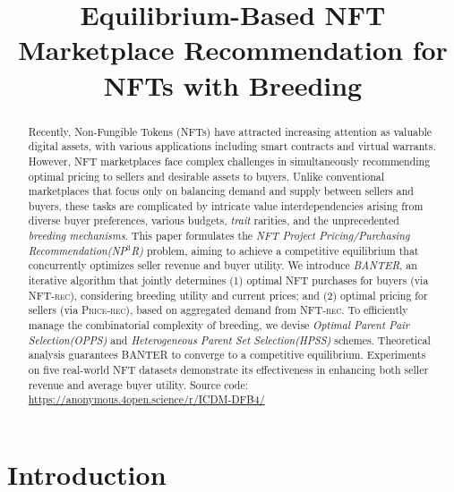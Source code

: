 \documentclass[conference]{IEEEtran}
\newcommand{\1}[1]{\mathds{1}\left[#1\right]}
\theoremstyle{plain}
\newcommand{\method}{\textsf{BANTER}\xspace}
\newcommand{\problem}{NP$^3$R\xspace}
\newcommand{\problemfull}{NFT Project Pricing/Purchasing Recommendation\xspace}
\newcommand{\homosfull}{Optimal Parent Pair Selection\xspace}
\newcommand{\homos}{OPPS\xspace}
\newcommand{\hetersfull}{Heterogeneous Parent Set Selection\xspace}
\newcommand{\heters}{HPSS\xspace}
\newcommand{\finddemand}{\textsc{NFT-rec}\xspace}
\newcommand{\findprice}{\textsc{Price-rec}\xspace}
\newcommand{\anonymizedcode}{\url{https://anonymous.4open.science/r/ICDM-DFB4/}\xspace}
\begin{document}
\title{Equilibrium-Based NFT Marketplace Recommendation for NFTs with Breeding}

\author{}

\maketitle
\begin{abstract}
Recently, Non-Fungible Tokens (NFTs) have attracted increasing attention as valuable digital assets, with various applications including smart contracts and virtual warrants. However, NFT marketplaces face complex challenges in simultaneously recommending optimal pricing to sellers and desirable assets to buyers. Unlike conventional marketplaces that focus only on balancing demand and supply between sellers and buyers, these tasks are complicated by intricate value interdependencies arising from diverse buyer preferences, various budgets, \textit{trait} rarities, and the unprecedented \textit{breeding mechanisms}. This paper formulates the \emph{\problemfull (\problem)} problem, aiming to achieve a competitive equilibrium that concurrently optimizes seller revenue and buyer utility. We introduce \emph{\method}, an iterative algorithm that jointly determines (1) optimal NFT purchases for buyers (via \finddemand), considering breeding utility and current prices; and (2) optimal pricing for sellers (via \findprice), based on aggregated demand from \finddemand. To efficiently manage the combinatorial complexity of breeding, we devise \emph{\homosfull (\homos)} and \emph{\hetersfull (\heters)} schemes. Theoretical analysis guarantees \method to converge to a competitive equilibrium. Experiments on five real-world NFT datasets demonstrate its effectiveness in enhancing both seller revenue and average buyer utility. Source code: \anonymizedcode
\end{abstract}

\IEEEpeerreviewmaketitle

\section{Introduction}
\end{document}
